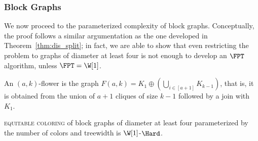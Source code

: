 \subsubsection{Block Graphs}

We now proceed to the parameterized complexity of block graphs.
Conceptually, the proof follows a similar argumentation as the one developed in Theorem~\ref{thm:dis_split}; in fact, we are able to show that even restricting the problem to graphs of diameter at least four is not enough to develop an $\FPT$ algorithm, unless $\FPT = \W[1]$.
 
\begin{definition}
    An $(a,k)$-flower is the graph $F(a,k) = K_1 \oplus \left(\bigcup_{i \in [a+1]} K_{k-1}\right)$, that is, it is obtained from the union of $a+1$ cliques of size $k-1$ followed by a join with $K_1$.
\end{definition}

\begin{theorem}
    \label{thm:blocks}
    \textsc{equitable coloring} of block graphs of diameter at least four parameterized by the number of colors and treewidth is $\W[1]$-$\Hard$. 
\end{theorem}

